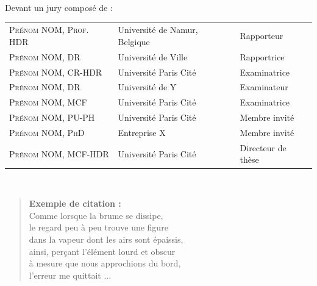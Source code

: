 \documentclass[a4paper,12pt,twoside,french]{book}
[a4paper,12pt,twoside]
\begin{document}
\begin{titlepage}
		\vspace{1cm}
Devant un jury composé de : %
		\begin{center}
			\begin{tabular}{l@{\hskip 1cm}l@{\hskip 1cm}l}
				\textsc{Prénom NOM, Prof. HDR} & Université de Namur, Belgique  & Rapporteur \\
				\textsc{Prénom NOM, DR}  & Université de Ville &Rapportrice \\
				\textsc{Prénom NOM, CR-HDR}  & Université Paris Cité &Examinatrice\\
                \textsc{Prénom NOM, DR}  & Université de Y &Examinateur\\
				\textsc{Prénom NOM, MCF}  &Université Paris Cité  &Examinatrice \\
				\textsc{Prénom NOM, PU-PH}  &Université Paris Cité &Membre invité \\
				\textsc{Prénom NOM, PhD}  &Entreprise X &Membre invité \\
				\textsc{Prénom NOM, MCF-HDR}  &Université Paris Cité &Directeur de thèse \\
			\end{tabular}\\[1cm]
		\end{center}

	\newpage %
	\thispagestyle{empty} %
	\end{titlepage}

\renewcommand{\chaptermark}[1]{\markboth{#1}{}}


\frontmatter %


\clearpage
\vspace*{0.2\textheight}

\begin{quote}
\textbf{Exemple de citation :} \\
Comme lorsque la brume se dissipe, \\ le regard peu à peu trouve une figure\\ dans la vapeur dont les airs sont épaissis, \\ ainsi, perçant l'élément lourd et obscur\\ à mesure que nous approchions du bord, \\l'erreur me quittait ...
\end{quote} \bigbreak
\end{document}
